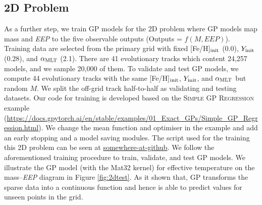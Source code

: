 \subsection{2D Problem}\label{sec:2d}

As a further step, we train GP models for the 2D problem where GP models map mass and {\it EEP} to the five observable outputs (Outputs = $f(M, EEP)$). Training data are selected from the primary grid with fixed [Fe/H]$_{\rm init}$ (0.0), $Y_{\rm init}$ (0.28), and $\alpha_{\rm MLT}$ (2.1). There are 41 evolutionary tracks which content 24,257 models, and we sample 20,000 of them. To validate and test GP models, we compute 44 evolutionary tracks with the same [Fe/H]$_{\rm init}$, $Y_{\rm init}$, and $\alpha_{\rm MLT}$ but random $M$. We split the off-grid track half-to-half as validating and testing datasets. 
%
Our code for training is developed based on the \textsc{Simple GP Regression} example (\url{https://docs.gpytorch.ai/en/stable/examples/01_Exact_GPs/Simple_GP_Regression.html}). We change the mean function and optimiser in the example and add an early stopping and a model saving modules. The script used for the training this 2D problem can be seen at \url{somewhere-at-github}. 
%
We follow the aforementioned training procedure to train, validate, and test GP models. We illustrate the GP model (with the Mat32 kernel) for effective temperature on the mass--{\it EEP} diagram in Figure \ref{fig:2dtest}. As it shown that, GP transforms the sparse data into a continuous function and hence is able to predict values for unseen points in the grid. 
%

